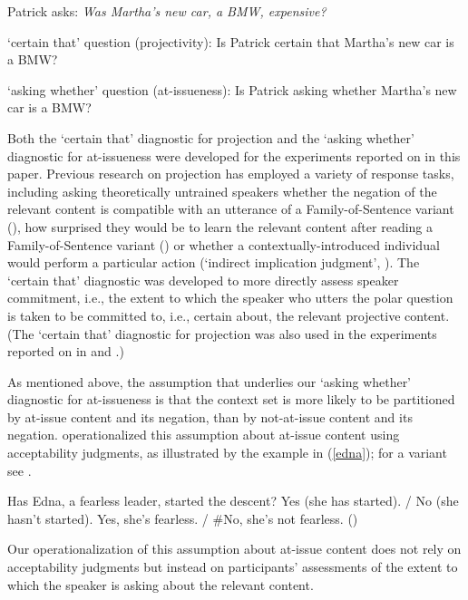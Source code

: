 \documentclass[11pt,fleqn]{article}
\newcommand{\6}{\mbox{$[\hspace*{-.6mm}[$}}
\newcommand{\9}{\mbox{$]\hspace*{-.6mm}]$}}
\def\infelic{{\leavevmode\llap{\#}}}
\begin{document}
\begin{exe}

\ex\label{stim} Patrick asks: {\em Was Martha's new car, a BMW, expensive?} 

\begin{xlist}
\ex `certain that' question (projectivity): Is Patrick certain that Martha's new car is a BMW?

\ex `asking whether' question (at-issueness): Is Patrick asking whether Martha's new car is a BMW?

\end{xlist}

\end{exe}
Both the `certain that' diagnostic for projection and the `asking whether' diagnostic for at-issueness were developed for the experiments reported on in this paper. Previous research on projection has employed a variety of response tasks, including asking theoretically untrained speakers whether the negation of the relevant content is compatible with an utterance of a Family-of-Sentence variant (\citealt{xue-onea11}), how surprised they would be to learn the relevant content after reading a Family-of-Sentence variant (\citealt{smith-hall11}) or whether a contextually-introduced individual would perform a particular action (`indirect implication judgment', \citealt{brst-lang11}). The `certain that' diagnostic was developed to more directly assess speaker commitment, i.e., the extent to which the speaker who utters the polar question is taken to be committed to, i.e., certain about, the relevant projective content. (The `certain that' diagnostic for projection was also used in the experiments reported on in  \citealt{tonhauser-salt26} and \citealt*{stevens-etal2017}.)

As mentioned above, the assumption that underlies our `asking whether' diagnostic for at-issueness is that the context set is more likely to be partitioned by at-issue content and its negation, than by not-at-issue content and its negation. \citet{amaral-etal07} operationalized this assumption about at-issue content using acceptability judgments, as illustrated by the example in (\ref{edna}); for a variant see \citealt{tonhauser-sula6}.

\begin{exe}
\ex\label{edna}
\begin{xlist}
 Has Edna, a fearless leader, started the descent?
 Yes (she has started). / No (she hasn't started).
 \infelic Yes, she's fearless. / \#No, she's not fearless. \hfill (\citealt[731]{amaral-etal07})
\end{xlist}
\end{exe}
Our operationalization of this assumption about at-issue content does not rely on acceptability judgments but instead on participants' assessments of the extent to which the speaker is asking about the relevant content. 
\end{document}
